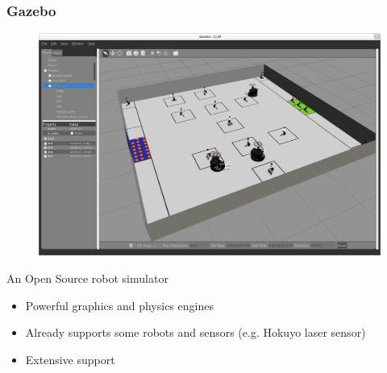 \documentclass[]{beamer}
\begin{document}
\begin{frame}
  \frametitle{Gazebo}
  \begin{multicols}{2}
    \begin{figure}
      \includegraphics[scale=0.115]{../pics/gazebo_window.png}
    \end{figure}
    An Open Source robot simulator
    \begin{itemize}
    \item Powerful graphics and physics engines %
    \item Already supports some robots and sensors (e.g. Hokuyo laser sensor)
    \item Extensive support
    \end{itemize}
  \end{multicols}
\end{frame}
\end{document}
